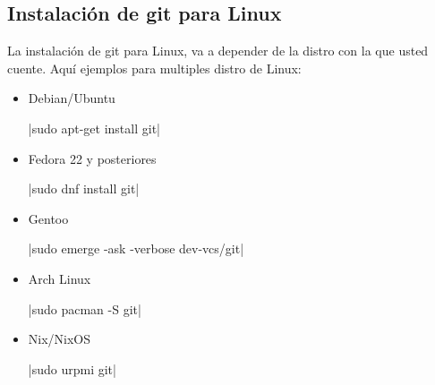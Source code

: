 \subsection{Instalación de git para Linux}

La instalación de git para Linux, va a depender de la distro con la que usted cuente. Aquí ejemplos para multiples distro de Linux:

\begin{itemize}
	\item Debian/Ubuntu
	\begin{ubuntu}
		|sudo apt-get install git|
	\end{ubuntu}
	
	\item Fedora 22 y posteriores
	\begin{fedora}
		|sudo dnf install git|
	\end{fedora}

	\item Gentoo
	\begin{gentoo}
		|sudo emerge -ask -verbose dev-vcs/git|
	\end{gentoo}
	
	\item Arch Linux
	\begin{archLinux}
		|sudo pacman -S git|
	\end{archLinux}
		
	\item Nix/NixOS
	\begin{nixos}
		|sudo urpmi git|
	\end{nixos}

\end{itemize}

